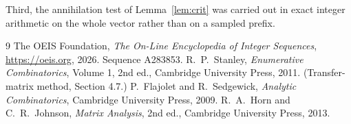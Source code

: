 \documentclass[11pt,a4paper]{article}
\theoremstyle{plain}
\theoremstyle{definition}
\begin{document}
Third, the annihilation test of Lemma~\ref{lem:crit} was carried out in exact integer
arithmetic on the whole vector rather than on a sampled prefix.

\begin{thebibliography}{9}
 The OEIS Foundation, \emph{The On-Line Encyclopedia of Integer
Sequences}, \url{https://oeis.org}, 2026. Sequence A283853.
 R.~P.~Stanley, \emph{Enumerative Combinatorics}, Volume 1, 2nd ed.,
Cambridge University Press, 2011. (Transfer-matrix method, Section 4.7.)
 P.~Flajolet and R.~Sedgewick, \emph{Analytic Combinatorics}, Cambridge
University Press, 2009.
 R.~A.~Horn and C.~R.~Johnson, \emph{Matrix Analysis}, 2nd ed., Cambridge
University Press, 2013.
\end{thebibliography}
\end{document}
